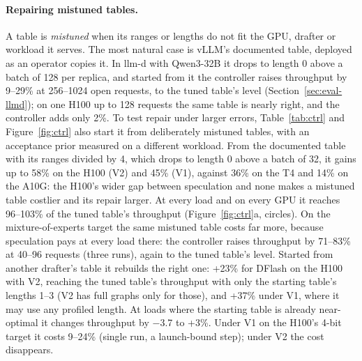 \documentclass{article}
\newcommand{\term}[1]{\emph{#1}}
\begin{document}
\paragraph{Repairing mistuned tables.} A table is \term{mistuned} when its ranges or lengths do not fit the GPU, drafter or workload it serves. The most natural case is vLLM's documented table, deployed as an operator copies it. In llm-d with Qwen3-32B it drops to length 0 above a batch of 128 per replica, and started from it the controller raises throughput by 9--29\% at 256--1024 open requests, to the tuned table's level (Section~\ref{sec:eval-llmd}); on one H100 up to 128 requests the same table is nearly right, and the controller adds only 2\%. To test repair under larger errors, Table~\ref{tab:ctrl} and Figure~\ref{fig:ctrl} also start it from deliberately mistuned tables, with an acceptance prior measured on a different workload. From the documented table with its ranges divided by 4, which drops to length 0 above a batch of 32, it gains up to 58\% on the H100 (V2) and 45\% (V1), against 36\% on the T4 and 14\% on the A10G: the H100's wider gap between speculation and none makes a mistuned table costlier and its repair larger. At every load and on every GPU it reaches 96--103\% of the tuned table's throughput (Figure~\ref{fig:ctrl}a, circles). On the mixture-of-experts target the same mistuned table costs far more, because speculation pays at every load there: the controller raises throughput by 71--83\% at 40--96 requests (three runs), again to the tuned table's level. Started from another drafter's table it rebuilds the right one: +23\% for DFlash on the H100 with V2, reaching the tuned table's throughput with only the starting table's lengths 1--3 (V2 has full graphs only for those), and +37\% under V1, where it may use any profiled length. At loads where the starting table is already near-optimal it changes throughput by $-$3.7 to +3\%. Under V1 on the H100's 4-bit target it costs 9--24\% (single run, a launch-bound step); under V2 the cost disappears.
\end{document}
